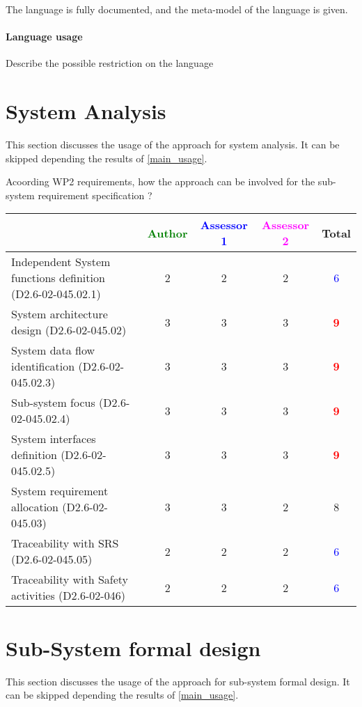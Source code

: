 The language is fully documented, and the meta-model of the language
is given.
\paragraph{Language usage} Describe the possible restriction on the language

\section{System Analysis}
This section discusses the usage of the approach for system analysis.
It can be skipped depending the results of \ref{main_usage}.

Acoording WP2 requirements, how the approach can be involved for the sub-system requirement specification ?

\begin{tabular}{|l | c | c | c | c|}
\hline
& \textcolor{green}{Author} & \textcolor{blue}{Assessor 1} & \textcolor{magenta}{Assessor 2} & Total \\
\hline
Independent System functions definition (D2.6-02-045.02.1)  &2 &2 & 2    & \textcolor{blue}{6} \\
\hline 
System architecture design (D2.6-02-045.02) &3 &3 & 3    & \textcolor{red}{\textbf{9}} \\
\hline
System data flow identification (D2.6-02-045.02.3)  &3 &3 & 3    & \textcolor{red}{\textbf{9}} \\
\hline
Sub-system focus (D2.6-02-045.02.4)  &3 &3 & 3    & \textcolor{red}{\textbf{9}} \\
\hline
System interfaces definition (D2.6-02-045.02.5)  &3 &3 & 3    & \textcolor{red}{\textbf{9}} \\
\hline
System requirement allocation (D2.6-02-045.03)  &3 &3 & 2    &  8 \\
\hline
Traceability with SRS (D2.6-02-045.05)  &2 &2 & 2    & \textcolor{blue}{6}  \\
\hline
Traceability with Safety activities (D2.6-02-046)  &2 &2 & 2     & \textcolor{blue}{6}   \\
\hline
\end{tabular}



\section{Sub-System formal design}
This section discusses the usage of the approach for sub-system formal design.
It can be skipped depending the results of \ref{main_usage}.


